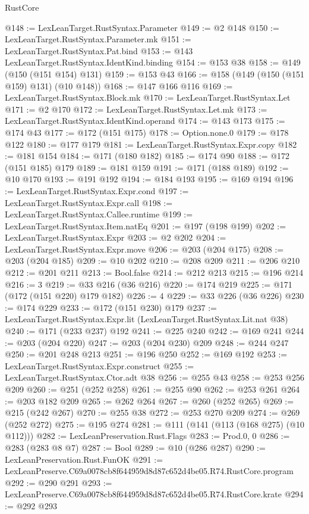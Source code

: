 \begin{lexlean}{RustCore}
\begin{coremodule}
@148 := LexLeanTarget.RustSyntax.Parameter
@149 := @2 @148
@150 := LexLeanTarget.RustSyntax.Parameter.mk
@151 := LexLeanTarget.RustSyntax.Pat.bind
@153 := @143 LexLeanTarget.RustSyntax.IdentKind.binding
@154 := @153 @38
@158 := @149 (@150 (@151 @154) @131)
@159 := @153 @43
@166 := @158 (@149 (@150 (@151 @159) @131) (@10 @148))
@168 := @147 @166 @116
@169 := LexLeanTarget.RustSyntax.Block.mk
@170 := LexLeanTarget.RustSyntax.Let
@171 := @2 @170
@172 := LexLeanTarget.RustSyntax.Let.mk
@173 := LexLeanTarget.RustSyntax.IdentKind.operand
@174 := @143 @173
@175 := @174 @43
@177 := @172 (@151 @175)
@178 := Option.none.{0}
@179 := @178 @122
@180 := @177 @179
@181 := LexLeanTarget.RustSyntax.Expr.copy
@182 := @181 @154
@184 := @171 (@180 @182)
@185 := @174 @90
@188 := @172 (@151 @185) @179
@189 := @181 @159
@191 := @171 (@188 @189)
@192 := @10 @170
@193 := @191 @192
@194 := @184 @193
@195 := @169 @194
@196 := LexLeanTarget.RustSyntax.Expr.cond
@197 := LexLeanTarget.RustSyntax.Expr.call
@198 := LexLeanTarget.RustSyntax.Callee.runtime
@199 := LexLeanTarget.RustSyntax.Item.natEq
@201 := @197 (@198 @199)
@202 := LexLeanTarget.RustSyntax.Expr
@203 := @2 @202
@204 := LexLeanTarget.RustSyntax.Expr.move
@206 := @203 (@204 @175)
@208 := @203 (@204 @185)
@209 := @10 @202
@210 := @208 @209
@211 := @206 @210
@212 := @201 @211
@213 := Bool.false
@214 := @212 @213
@215 := @196 @214
@216 := 3
@219 := @33 @216 (@36 @216)
@220 := @174 @219
@225 := @171 (@172 (@151 @220) @179 @182)
@226 := 4
@229 := @33 @226 (@36 @226)
@230 := @174 @229
@233 := @172 (@151 @230) @179
@237 := LexLeanTarget.RustSyntax.Expr.lit (LexLeanTarget.RustSyntax.Lit.nat @38)
@240 := @171 (@233 @237) @192
@241 := @225 @240
@242 := @169 @241
@244 := @203 (@204 @220)
@247 := @203 (@204 @230) @209
@248 := @244 @247
@250 := @201 @248 @213
@251 := @196 @250
@252 := @169 @192
@253 := LexLeanTarget.RustSyntax.Expr.construct
@255 := LexLeanTarget.RustSyntax.Ctor.adt @38
@256 := @255 @43
@258 := @253 @256 @209
@260 := @251 (@252 @258)
@261 := @255 @90
@262 := @253 @261
@264 := @203 @182 @209
@265 := @262 @264
@267 := @260 (@252 @265)
@269 := @215 (@242 @267)
@270 := @255 @38
@272 := @253 @270 @209
@274 := @269 (@252 @272)
@275 := @195 @274
@281 := @111 (@141 (@113 (@168 @275) (@10 @112)))
@282 := LexLeanPreservation.Rust.Flags
@283 := Prod.{0, 0}
@286 := @283 (@283 @8 @7)
@287 := Bool
@289 := @10 (@286 @287)
@290 := LexLeanPreservation.Rust.FunOK
@291 := LexLeanPreserve.C69a0078cb8f644959d8d87c652d4be05.R74.RustCore.program
@292 := @290 @291
@293 := LexLeanPreserve.C69a0078cb8f644959d8d87c652d4be05.R74.RustCore.krate
@294 := @292 @293

\end{coremodule}
\end{lexlean}
